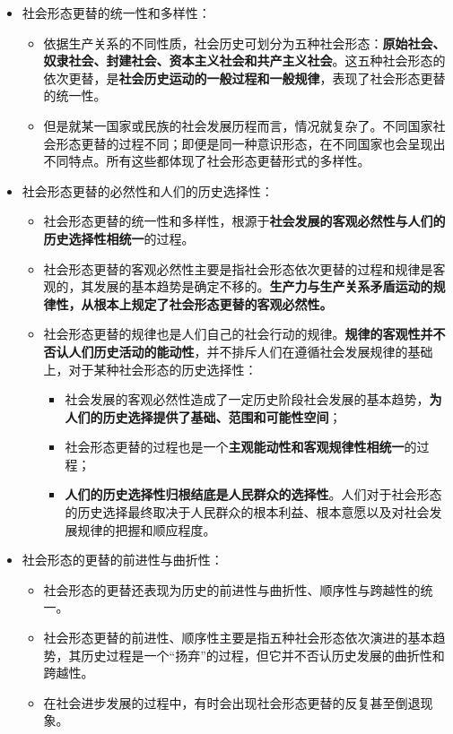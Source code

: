 \documentclass[
]{article}
\begin{document}
\begin{itemize}
\item
  社会形态更替的统一性和多样性：

  \begin{itemize}
  \item
    依据生产关系的不同性质，社会历史可划分为五种社会形态：\textbf{原始社会、奴隶社会、封建社会、资本主义社会和共产主义社会}。这五种社会形态的依次更替，是\textbf{社会历史运动的一般过程和一般规律}，表现了社会形态更替的统一性。
  \item
    但是就某一国家或民族的社会发展历程而言，情况就复杂了。不同国家社会形态更替的过程不同；即便是同一种意识形态，在不同国家也会呈现出不同特点。所有这些都体现了社会形态更替形式的多样性。
  \end{itemize}
\item
  社会形态更替的必然性和人们的历史选择性：

  \begin{itemize}
  \item
    社会形态更替的统一性和多样性，根源于\textbf{社会发展的客观必然性与人们的历史选择性相统一}的过程。
  \item
    社会形态更替的客观必然性主要是指社会形态依次更替的过程和规律是客观的，其发展的基本趋势是确定不移的。\textbf{生产力与生产关系矛盾运动的规律性，从根本上规定了社会形态更替的客观必然性。}
  \item
    社会形态更替的规律也是人们自己的社会行动的规律。\textbf{规律的客观性并不否认人们历史活动的能动性}，并不排斥人们在遵循社会发展规律的基础上，对于某种社会形态的历史选择性：

    \begin{itemize}
    \item
      社会发展的客观必然性造成了一定历史阶段社会发展的基本趋势，\textbf{为人们的历史选择提供了基础、范围和可能性空间}；
    \item
      社会形态更替的过程也是一个\textbf{主观能动性和客观规律性相统一}的过程；
    \item
      \textbf{人们的历史选择性归根结底是人民群众的选择性}。人们对于社会形态的历史选择最终取决于人民群众的根本利益、根本意愿以及对社会发展规律的把握和顺应程度。
    \end{itemize}
  \end{itemize}
\item
  社会形态的更替的前进性与曲折性：

  \begin{itemize}
  \item
    社会形态的更替还表现为历史的前进性与曲折性、顺序性与跨越性的统一。
  \item
    社会形态更替的前进性、顺序性主要是指五种社会形态依次演进的基本趋势，其历史过程是一个``扬弃''的过程，但它并不否认历史发展的曲折性和跨越性。
  \item
    在社会进步发展的过程中，有时会出现社会形态更替的反复甚至倒退现象。
  \end{itemize}
\end{itemize}
\end{document}
